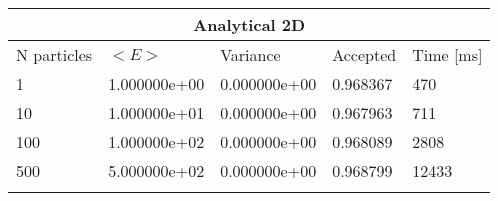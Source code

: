 \begin{tabular}{|l|l|l|l|l|}
\hline 
\multicolumn{5}{|c|}{Analytical 2D}\\ 
\hline 
N particles & $<E>$ & Variance & Accepted & Time [ms]\\ 
 \hline 
1 & 1.000000e+00 & 0.000000e+00 & 0.968367 & 470 \\ \hline 
10 & 1.000000e+01 & 0.000000e+00 & 0.967963 & 711 \\ \hline 
100 & 1.000000e+02 & 0.000000e+00 & 0.968089 & 2808 \\ \hline 
500 & 5.000000e+02 & 0.000000e+00 & 0.968799 & 12433 \\ \hline 
\label{h:a2} 
\end{tabular}
